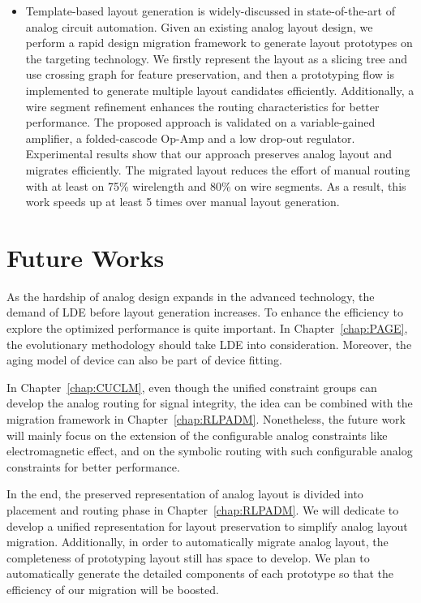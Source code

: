 \begin{itemize}
      \item Template-based layout generation is widely-discussed in state-of-the-art of analog circuit automation. Given an existing analog layout design, we perform a rapid design migration framework to generate layout prototypes on the targeting technology. We firstly represent the layout as a slicing tree and use crossing graph for feature preservation, and then a prototyping flow is implemented to generate multiple layout candidates efficiently. Additionally, a wire segment refinement enhances the routing characteristics for better performance. The proposed approach is validated on a variable-gained amplifier, a folded-cascode Op-Amp and a low drop-out regulator. Experimental results show that our approach preserves analog layout and migrates efficiently. The migrated layout reduces the effort of manual routing with at least on 75\% wirelength and 80\% on wire segments. As a result, this work speeds up at least 5 times over manual layout generation. 
    \end{itemize}

  \section{Future Works}\label{sec:FW}


    As the hardship of analog design expands in the advanced technology, the demand of LDE before layout generation increases. To enhance the efficiency to explore the optimized performance is quite important. In Chapter~\ref{chap:PAGE}, the evolutionary methodology should take LDE into consideration. Moreover, the aging model of device can also be part of device fitting. 

    In Chapter~\ref{chap:CUCLM}, even though the unified constraint groups can develop the analog routing for signal integrity, the idea can be combined with the migration framework in Chapter~\ref{chap:RLPADM}. Nonetheless, the future work will mainly focus on the extension of the configurable analog constraints like electromagnetic effect, and on the symbolic routing with such configurable analog constraints for better performance.

    In the end, the preserved representation of analog layout is divided into placement and routing phase in Chapter~\ref{chap:RLPADM}. We will dedicate to develop a unified representation for layout preservation to simplify analog layout migration. Additionally, in order to automatically migrate analog layout, the completeness of prototyping layout still has space to develop. We plan to automatically generate the detailed components of each prototype so that the efficiency of our migration will be boosted. 
